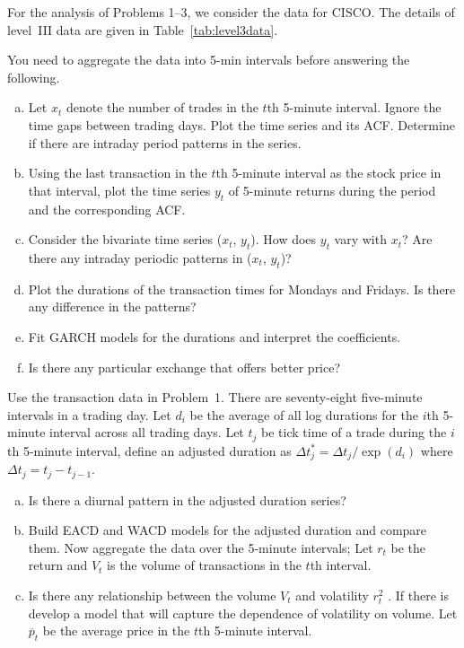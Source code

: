 For the analysis of Problems 1--3, we consider the data for CISCO. The details of level~III data are given in Table~\ref{tab:level3data}. \twomedskip


\prob You need to aggregate the data into 5-min intervals before answering the following.
        \begin{enumerate}[(a)]
        \item Let $x_t$ denote the number of trades in the $t$th 5-minute interval. Ignore the time gaps between trading days. Plot the time series and its ACF. Determine if there are intraday period patterns in the series.
        \item Using the last transaction in the $t$th 5-minute interval as the stock price in that interval, plot the time series $y_t$ of 5-minute returns during the period and the corresponding ACF.
        \item Consider the bivariate time series ($x_t$, $y_t$). How does $y_t$ vary with $x_t$? Are there any intraday periodic patterns in ($x_t$, $y_t$)?
        \item Plot the durations of the transaction times for Mondays and Fridays. Is there any difference in the patterns?
        \item Fit GARCH models for the durations and interpret the coefficients.
        \item Is there any particular exchange that offers better price? \twomedskip
        \end{enumerate}


\prob Use the transaction data in Problem~1. There are seventy-eight five-minute intervals in a trading day. Let $d_i$ be the average of all log durations for the $i$th 5-minute interval across all trading days. Let $t_j$ be tick time of a trade during the $i$th 5-minute interval, define an adjusted duration as $\Delta t_j^* = \Delta t_j/\exp(d_i)$ where $\Delta t_j = t_j - t_{j-1}$.
        \begin{enumerate}[(a)]
        \item Is there a diurnal pattern in the adjusted duration series?
        \item Build EACD and WACD models for the adjusted duration and compare them. Now aggregate the data over the 5-minute intervals; Let $r_t$ be the return and $V_t$ is the volume of transactions in the $t$th interval.
        \item Is there any relationship between the volume $V_t$ and volatility $r_t^2$ . If there is develop a model that will capture the dependence of volatility on volume. Let $\overline{p}_t$ be the average price in the $t$th 5-minute
        interval. \twomedskip
        \end{enumerate}


